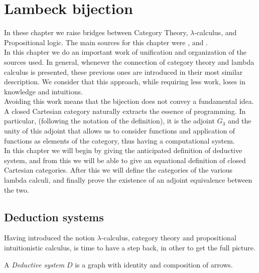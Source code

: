 
\chapter{Lambeck bijection}
\label{chap:4}
\thispagestyle{empty}
In these chapter we raise bridges between Category Theory, $\lambda$-calculus, and Propositional logic. The main sources for this chapter were  \cite{lambek1988introduction}, \cite{lambek1985cartesian} and \cite[Chapter 6]{selinger2008lecture}.\\

In this chapter we do an important work of unification and organization of the sources used. In general, whenever the connection of category theory and lambda calculus is presented, these previous ones are introduced in their most similar description. We consider that this approach, while requiring less work, loses in knowledge and intuitions.\\


Avoiding this work means that the bijection does not convey a fundamental idea. A closed Cartesian category naturally extracts the essence of programming. In particular, (following the notation of the definition), it is the adjoint $G_3$ and the unity of this adjoint that allows us to consider functions and application of functions as elements of the category, thus having a computational system.\\

In this chapter we will begin by giving the anticipated definition of deductive system, and from this we will be able to give an equational definition of closed Cartesian categories.  After this we will define the categories of the various lambda calculi, and finally prove the existence of an adjoint equivalence between the two.\\



\section{Deduction systems}
Having introduced the notion $\lambda$-calculus, category theory and propositional intuitionistic calculus, is time to have a step back, in other to get the full picture.

\begin{definition}
  A \emph{Deductive system} $D$ is a graph  with identity and composition of arrows.
\end{definition}


